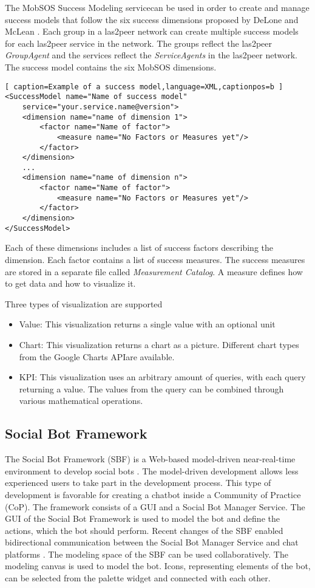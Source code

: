The MobSOS Success Modeling service\footnotemark can be used in order to create and manage success models that follow the six success dimensions proposed by DeLone and McLean \cite{DeMc92}.
Each group in a las2peer network can create multiple success models for each las2peer service in the network. 
The groups reflect the las2peer \emph{GroupAgent} and the services reflect the \emph{ServiceAgents} in the las2peer network.
The success model contains the six MobSOS dimensions.
\begin{lstlisting}[ caption=Example of a success model,language=XML,captionpos=b ]
<SuccessModel name="Name of success model" 
    service="your.service.name@version">
    <dimension name="name of dimension 1">
        <factor name="Name of factor">
            <measure name="No Factors or Measures yet"/>
        </factor>
    </dimension>
    ...
    <dimension name="name of dimension n">
        <factor name="Name of factor">
            <measure name="No Factors or Measures yet"/>
        </factor>
    </dimension>
</SuccessModel>
\end{lstlisting}
Each of these dimensions includes a list of success factors describing the dimension.
Each factor contains a list of success measures. The success measures are stored in a separate file called \emph{Measurement Catalog}. A measure defines how to get data and how to visualize it. 

Three types of visualization are supported
\begin{itemize}
    \item Value: This visualization returns a single value with an optional unit
    \item Chart: This visualization returns a chart as a picture. Different chart types from the Google Charts API\footnotemark are available.
    \item KPI: This visualization uses an arbitrary amount of queries, with each query returning a value. The values from the query can be combined through various mathematical operations.
\end{itemize}


\subsection{Social Bot Framework}
The Social Bot Framework (SBF) is a Web-based model-driven near-real-time environment to develop social bots \cite{NLKl19,Neum18}. 
The model-driven development allows less experienced users to take part in the development process. This type of development is favorable for creating a chatbot inside a Community of Practice (CoP). 
The framework consists of a GUI and a Social Bot Manager Service.
The GUI of the Social Bot Framework is used to model the bot and define the actions, which the bot should perform. 
Recent changes of the SBF enabled bidirectional communication between the Social Bot Manager Service and chat platforms \cite{Wies19}.
The modeling space of the SBF can be used collaboratively. The modeling canvas is used to model the bot. Icons, representing elements of the bot, can be selected from the palette widget and connected with each other. 

